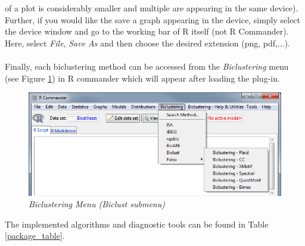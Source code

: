 \documentclass[a4paper]{article}\usepackage[]{graphicx}\usepackage[]{color}
\begin{document}
of a plot is considerably smaller and multiple are appearing in the same
device). Further, if you would like the save a graph appearing in the device,
simply select the device window and go to the working bar of R itself (not R
Commander). Here, select {\it File}, {\it Save As} and then choose the desired
extension (png, pdf,...).
\\ \\
\noindent Finally, each biclustering method can be accessed from the {\it
Biclustering} menu (see Figure \ref{biclustering_menu}) in R commander which
will appear after loading the plug-in.
\begin{figure}[H]
\centering
\includegraphics[scale=0.5]{figures/biclustering_menu.png}
\caption{{\it Biclustering Menu (Biclust submenu)}\label{biclustering_menu}}
\end{figure}
\noindent The implemented algorithms and diagnostic tools can be found in Table
\ref{package_table}.
\end{document}
